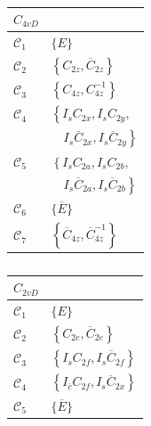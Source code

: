     \begin{table}
        \centering
        \begin{minipage}{0.32\linewidth}
            \begin{tabular}{l|l}
                $C_{4vD}$ & \\
                \hline
                $\mathcal{C}_{1}$ & $\{E\}$ \\
                $\mathcal{C}_{2}$ & $\left\{C_{2 z}, \overline{C}_{2 z}\right\}$ \\
                $\mathcal{C}_{3}$ & $\left\{C_{4 z}, C_{4 z}^{-1}\right\}$ \\
                $\mathcal{C}_{4}$ & $\left\{I_{s} C_{2 x}, I_{s} C_{2 y},\right.$\\
                & $\left.\quad I_{s} \overline{C}_{2 x}, I_{s} \overline{C}_{2 y}\right\}$ \\
                $\mathcal{C}_{5}$ & $\left\{I_{s} C_{2 a}, I_{s} C_{2 b},\right.$\\
                & $\left.\quad I_{s} \overline{C}_{2 a}, I_{s} \overline{C}_{2 b}\right\}$ \\
                $\mathcal{C}_{6}$ & $\{\overline{E}\}$ \\
                $\mathcal{C}_{7}$ & $\left\{\overline{C}_{4 z}, \overline{C}_{4 z}^{-1}\right\}$
            \end{tabular}
            \caption{}
            \label{table:c4vD}
        \end{minipage}
        \begin{minipage}{0.32\linewidth}
            \begin{tabular}{l|l}
                $C_{2vD}$ & \\
                \hline
                $\mathcal{C}_{1}$ & $\{E\}$ \\
                $\mathcal{C}_{2}$ & $\left\{C_{2 e}, \overline{C}_{2 e}\right\}$ \\
                $\mathcal{C}_{3}$ & $\left\{I_{s} C_{2 f}, I_{s} \overline{C}_{2 f}\right\}$ \\
                $\mathcal{C}_{4}$ & $\left\{I_{\overline{c}} C_{2 f}, I_{s} \overline{C}_{2 x}\right\}$ \\
                $\mathcal{C}_{5}$ & $\{\overline{E}\}$
            \end{tabular}
            \caption{}
            \label{table:c2vD}
        \end{minipage}
        \begin{minipage}{0.32\linewidth}

\end{minipage}
\end{table}
